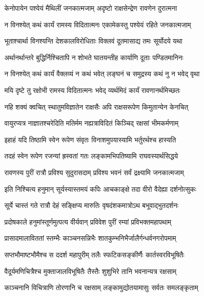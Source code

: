 \twolineshloka
{केनोपायेन पश्येयं मैथिलीं जनकात्मजाम्}
{अदृष्टो राक्षसेन्द्रेण रावणेन दुरात्मना} %

\twolineshloka
{न विनश्येत् कथं कार्यं रामस्य विदितात्मनः}
{एकामेकस्तु पश्येयं रहिते जनकात्मजाम्} %

\twolineshloka
{भूताश्चार्था विनश्यन्ति देशकालविरोधिताः}
{विक्लवं दूतमासाद्य तमः सूर्योदये यथा} %

\twolineshloka
{अर्थानर्थान्तरे बुद्धिर्निश्चितापि न शोभते}
{घातयन्तीह कार्याणि दूताः पण्डितमानिनः} %

\twolineshloka
{न विनश्येत् कथं कार्यं वैक्लव्यं न कथं भवेत्}
{लङ्घनं च समुद्रस्य कथं नु न भवेद् वृथा} %

\twolineshloka
{मयि दृष्टे तु रक्षोभी रामस्य विदितात्मनः}
{भवेद् व्यर्थमिदं कार्यं रावणानर्थमिच्छतः} %

\twolineshloka
{नहि शक्यं क्वचित् स्थातुमविज्ञातेन राक्षसैः}
{अपि राक्षसरूपेण किमुतान्येन केनचित्} %

\twolineshloka
{वायुरप्यत्र नाज्ञातश्चरेदिति मतिर्मम}
{नह्यत्राविदितं किञ्चिद् रक्षसां भीमकर्मणाम्} %

\twolineshloka
{इहाहं यदि तिष्ठामि स्वेन रूपेण संवृतः}
{विनाशमुपयास्यामि भर्तुरर्थश्च हास्यति} %

\twolineshloka
{तदहं स्वेन रूपेण रजन्यां ह्रस्वतां गतः}
{लङ्कामभिपतिष्यामि राघवस्यार्थसिद्धये} %

\twolineshloka
{रावणस्य पुरीं रात्रौ प्रविश्य सुदुरासदाम्}
{प्रविश्य भवनं सर्वं द्रक्ष्यामि जनकात्मजाम्} %

\twolineshloka
{इति निश्चित्य हनुमान् सूर्यस्यास्तमयं कपिः}
{आचकाङ्क्षे तदा वीरो वैदेह्या दर्शनोत्सुकः} %

\twolineshloka
{सूर्ये चास्तं गते रात्रौ देहं सङ्क्षिप्य मारुतिः}
{वृषदंशकमात्रोऽथ बभूवाद्भुतदर्शनः} %

\twolineshloka
{प्रदोषकाले हनुमांस्तूर्णमुत्पत्य वीर्यवान्}
{प्रविवेश पुरीं रम्यां प्रविभक्तमहापथाम्} %

\twolineshloka
{प्रासादमालाविततां स्तम्भैः काञ्चनसन्निभैः}
{शातकुम्भनिभैर्जालैर्गन्धर्वनगरोपमाम्} %

\twolineshloka
{सप्तभौमाष्टभौमैश्च स ददर्श महापुरीम्}
{तलैः स्फटिकसङ्कीर्णैः कार्तस्वरविभूषितैः} %

\twolineshloka
{वैदूर्यमणिचित्रैश्च मुक्ताजालविभूषितैः}
{तैस्तैः शुशुभिरे तानि भवनान्यत्र रक्षसाम्} %

\twolineshloka
{काञ्चनानि विचित्राणि तोरणानि च रक्षसाम्}
{लङ्कामुद्योतयामासुः सर्वतः समलङ्कृताम्} %

